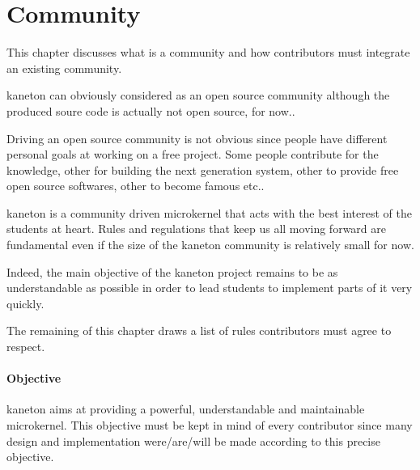 %
%
%
%
%
%

%
%

\chapter{Community}

This chapter discusses what is a community and how contributors must integrate
an existing community.

\newpage

%
%

kaneton can obviously considered as an open source community although the
produced soure code is actually not open source, for now..

Driving an open source community is not obvious since people have different
personal goals at working on a free project. Some people contribute for
the knowledge, other for building the next generation system, other to
provide free open source softwares, other to become famous etc..

kaneton is a community driven microkernel that acts with the best interest of
the students at heart. Rules and regulations that keep us all moving forward
are fundamental even if the size of the kaneton community is relatively small
for now.

Indeed, the main objective of the kaneton project remains to be as
understandable as possible in order to lead students to implement parts of
it very quickly.

The remaining of this chapter draws a list of rules contributors must agree
to respect.


\subsubsection{Objective}

kaneton aims at providing a powerful, understandable and maintainable
microkernel. This objective must be kept in mind of every contributor
since many design and implementation were/are/will be made according to
this precise objective.

